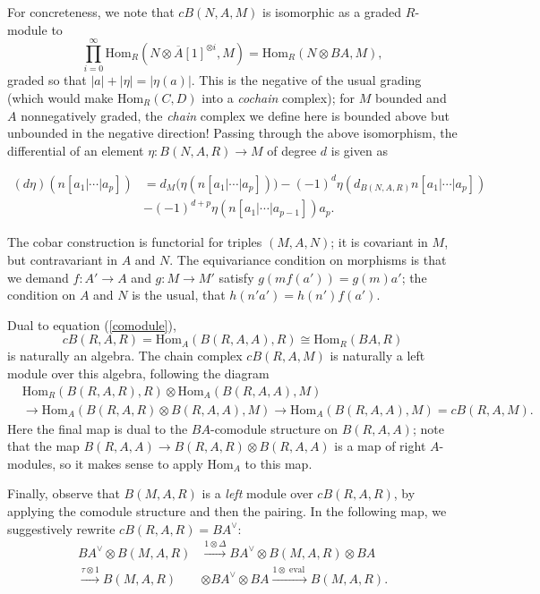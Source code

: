 \documentclass{memo-l}
\theoremstyle{definition}
\theoremstyle{remark}
\numberwithin{section}{chapter}
\numberwithin{equation}{chapter}
\begin{document}
For concreteness, we note that $cB(N,A,M)$ is isomorphic as a graded $R$-module to 
$$\prod_{i=0}^\infty \text{Hom}_R(N \otimes \overline A[1]^{\otimes i}, M) = \text{Hom}_R(N \otimes BA, M),$$ 
graded so that $|a| + |\eta| = |\eta(a)|$. This is the negative of the usual grading (which would make $\text{Hom}_R(C,D)$ into a \textit{cochain} complex); for $M$ bounded and $A$ nonnegatively graded, the \textit{chain} complex we define here is bounded above but unbounded in the negative direction! Passing through the above isomorphism, the differential of an element $\eta: B(N,A,R) \to M$ of degree $d$ is given as

\begin{align*}(d\eta)(n[a_1 | \cdots | a_p]) &= d_M\big(\eta(n[a_1 | \cdots | a_p])\big) - (-1)^d \eta\left(d_{B(N,A,R)}n[a_1 | \cdots | a_p]\right) \\
&- (-1)^{d+p} \eta(n[a_1 | \cdots | a_{p-1}])a_p.
\end{align*}

The cobar construction is functorial for triples $(M,A,N)$; it is covariant in $M$, but contravariant in $A$ and $N$. The equivariance condition on morphisms is that we demand $f: A' \to A$ and $g: M \to M'$ satisfy $g(mf(a')) = g(m)a'$; the condition on $A$ and $N$ is the usual, that $h(n'a') = h(n')f(a')$.

Dual to equation (\ref{comodule}), $$cB(R,A,R) = \text{Hom}_A(B(R,A,A), R) \cong \text{Hom}_R(BA, R)$$ is naturally an algebra. The chain complex $cB(R,A,M)$ is naturally a left module over this algebra, following the diagram \begin{align*}&\text{Hom}_R(B(R,A,R),R) \otimes \text{Hom}_A(B(R,A,A), M) \\
&\to \text{Hom}_A(B(R,A,R) \otimes B(R,A,A), M)  \to \text{Hom}_A(B(R,A,A), M) = cB(R, A, M).\end{align*} 
Here the final map is dual to the $BA$-comodule structure on $B(R,A,A)$; note that the map $B(R,A,A) \to B(R,A,R) \otimes B(R,A,A)$ is a map of right $A$-modules, so it makes sense to apply $\text{Hom}_A$ to this map.

Finally, observe that $B(M, A, R)$ is a \emph{left} module over $cB(R,A,R)$, by applying the comodule structure and then the pairing. In the following map, we suggestively rewrite $cB(R,A,R) = BA^\vee$: 
\begin{align*} BA^\vee \otimes B(M,A,R) &\xrightarrow{1 \otimes \Delta} BA^\vee \otimes B(M,A,R) \otimes BA \\
\xrightarrow{\tau \otimes 1} B(M,A,R) &\otimes BA^\vee \otimes BA \xrightarrow{1 \otimes \operatorname{eval}} B(M,A,R).\end{align*}
\end{document}
